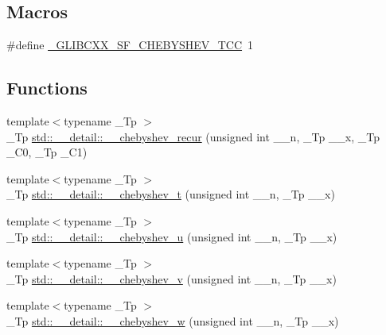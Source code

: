 \subsection*{Macros}
\begin{DoxyCompactItemize}
\item 
\#define \hyperlink{sf__chebyshev_8tcc_a4a6b0a9b7599b04e1e7316ab679fa7f5}{\+\_\+\+G\+L\+I\+B\+C\+X\+X\+\_\+\+S\+F\+\_\+\+C\+H\+E\+B\+Y\+S\+H\+E\+V\+\_\+\+T\+C\+C}~1
\end{DoxyCompactItemize}
\subsection*{Functions}
\begin{DoxyCompactItemize}
\item 
{\footnotesize template$<$typename \+\_\+\+Tp $>$ }\\\+\_\+\+Tp \hyperlink{namespacestd_1_1____detail_a3a893b4c60f3245af5db4ca792c4b2cf}{std\+::\+\_\+\+\_\+detail\+::\+\_\+\+\_\+chebyshev\+\_\+recur} (unsigned int \+\_\+\+\_\+n, \+\_\+\+Tp \+\_\+\+\_\+x, \+\_\+\+Tp \+\_\+\+C0, \+\_\+\+Tp \+\_\+\+C1)
\item 
{\footnotesize template$<$typename \+\_\+\+Tp $>$ }\\\+\_\+\+Tp \hyperlink{namespacestd_1_1____detail_af4ba1015e914cdd23d9e5d2be69740c1}{std\+::\+\_\+\+\_\+detail\+::\+\_\+\+\_\+chebyshev\+\_\+t} (unsigned int \+\_\+\+\_\+n, \+\_\+\+Tp \+\_\+\+\_\+x)
\item 
{\footnotesize template$<$typename \+\_\+\+Tp $>$ }\\\+\_\+\+Tp \hyperlink{namespacestd_1_1____detail_aa3289db0a53f55007bc10dc94f15c1f7}{std\+::\+\_\+\+\_\+detail\+::\+\_\+\+\_\+chebyshev\+\_\+u} (unsigned int \+\_\+\+\_\+n, \+\_\+\+Tp \+\_\+\+\_\+x)
\item 
{\footnotesize template$<$typename \+\_\+\+Tp $>$ }\\\+\_\+\+Tp \hyperlink{namespacestd_1_1____detail_a684b312a311bbe2065a2633220f4507d}{std\+::\+\_\+\+\_\+detail\+::\+\_\+\+\_\+chebyshev\+\_\+v} (unsigned int \+\_\+\+\_\+n, \+\_\+\+Tp \+\_\+\+\_\+x)
\item 
{\footnotesize template$<$typename \+\_\+\+Tp $>$ }\\\+\_\+\+Tp \hyperlink{namespacestd_1_1____detail_ae220390e755bdc4908e040fd68426d14}{std\+::\+\_\+\+\_\+detail\+::\+\_\+\+\_\+chebyshev\+\_\+w} (unsigned int \+\_\+\+\_\+n, \+\_\+\+Tp \+\_\+\+\_\+x)
\end{DoxyCompactItemize}


